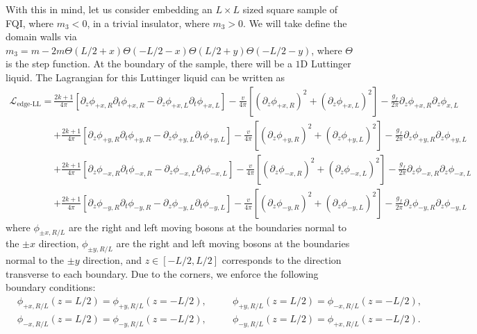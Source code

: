 \documentclass[%
 reprint,
 amsmath,amssymb,
 aps,
]{revtex4-1}
\begin{document}
\begin{appendix}
With this in mind, let us consider embedding an $L \times L$ sized square sample of FQI, where $m_3<0$, in a trivial insulator, where $m_3>0$. We will take define the domain walls via $m_3 = m-2m\Theta(L/2+x)\Theta(-L/2-x)\Theta(L/2+y)\Theta(-L/2-y)$, where $\Theta$ is the step function. At the boundary of the sample, there will be a $1$D Luttinger liquid. The Lagrangian for this Luttinger liquid can be written as 
\begin{equation}\begin{split}
\mathcal{L}_{\text{edge-LL}} = &\frac{2k+1}{4\pi} [\partial_z \phi_{+x,R} \partial_t \phi_{+x,R} - \partial_z \phi_{+x,L} \partial_t \phi_{+x,L}] - \frac{v}{4\pi}[(\partial_z \phi_{+x,R} )^2 + (\partial_z \phi_{+x,L})^2 ] - \frac{g_f}{2\pi}\partial_z \phi_{+x,R} \partial_z \phi_{x,L}\\
&+\frac{2k+1}{4\pi} [\partial_z \phi_{+y,R} \partial_t \phi_{+y,R} - \partial_z \phi_{+y,L} \partial_t \phi_{+y,L}] - \frac{v}{4\pi}[(\partial_z \phi_{+y,R})^2 + (\partial_z \phi_{+y,L})^2 ] - \frac{g_f}{2\pi}\partial_z \phi_{+y,R} \partial_z \phi_{+y,L}\\
&+\frac{2k+1}{4\pi} [\partial_z \phi_{-x,R} \partial_t \phi_{-x,R} - \partial_z \phi_{-x,L} \partial_t \phi_{-x,L}] - \frac{v}{4\pi}[(\partial_z \phi_{-x,R})^2 + (\partial_z \phi_{-x,L})^2] - \frac{g_f}{2\pi}\partial_z \phi_{-x,R} \partial_z \phi_{-x,L}\\
&+\frac{2k+1}{4\pi} [\partial_z \phi_{-y,R} \partial_t \phi_{-y,R} - \partial_z \phi_{-y,L} \partial_t \phi_{-y,L}] - \frac{v}{4\pi}[(\partial_z \phi_{-y,R})^2 + (\partial_z \phi_{-y,L})^2 ] - \frac{g_f}{2\pi}\partial_z \phi_{-y,R} \partial_z \phi_{-y,L}
\label{Aeq:DWLL}\end{split}\end{equation}
where $ \phi_{\pm x,R/L}$ are the right and left moving bosons at the boundaries normal to the $\pm x$ direction, $ \phi_{\pm y,R/L}$ are the right and left moving bosons at the boundaries normal to the $\pm y$ direction, and $z \in [-L/2,L/2]$ corresponds to the direction transverse to each boundary. Due to the corners, we enforce the following boundary conditions:  
\begin{equation}\begin{split}
  &\phi_{+x,R/L}(z = L/2) = \phi_{+y,R/L}(z = -L/2), \phantom{==}\phi_{+y,R/L}(z = L/2) = \phi_{-x,R/L}(z = -L/2),\\
  &\phi_{-x,R/L}(z = L/2) = \phi_{-y,R/L}(z = -L/2), \phantom{==} \phi_{-y,R/L}(z = L/2) = \phi_{+x,R/L}(z = -L/2).
\end{split}\end{equation}



\end{appendix}
\end{document}
